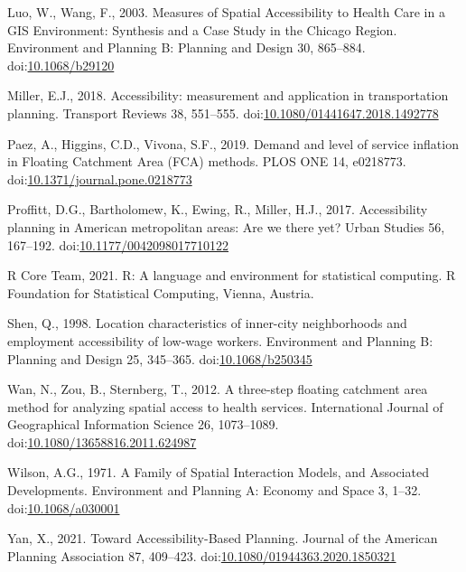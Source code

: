\documentclass[]{elsarticle} %
\newlength{\cslhangindent}
\newlength{\cslentryspacingunit} %
\newenvironment{CSLReferences}[2] %
 {%
  \setlength{\parindent}{0pt}
  \ifodd #1
  \let\oldpar\par
  \def\par{\hangindent=\cslhangindent\oldpar}
  \fi
  \setlength{\parskip}{#2\cslentryspacingunit}
 }%
 {}
\begin{document}
\begin{CSLReferences}{1}{0}
\leavevmode{}%
Luo, W., Wang, F., 2003. Measures of Spatial Accessibility to Health
Care in a GIS Environment: Synthesis and a Case Study in the Chicago
Region. Environment and Planning B: Planning and Design 30, 865--884.
doi:\href{https://doi.org/10.1068/b29120}{10.1068/b29120}

\leavevmode{}%
Miller, E.J., 2018. Accessibility: measurement and application in
transportation planning. Transport Reviews 38, 551--555.
doi:\href{https://doi.org/10.1080/01441647.2018.1492778}{10.1080/01441647.2018.1492778}

\leavevmode{}%
Paez, A., Higgins, C.D., Vivona, S.F., 2019. Demand and level of service
inflation in Floating Catchment Area (FCA) methods. PLOS ONE 14,
e0218773.
doi:\href{https://doi.org/10.1371/journal.pone.0218773}{10.1371/journal.pone.0218773}

\leavevmode{}%
Proffitt, D.G., Bartholomew, K., Ewing, R., Miller, H.J., 2017.
Accessibility planning in American metropolitan areas: Are we there yet?
Urban Studies 56, 167--192.
doi:\href{https://doi.org/10.1177/0042098017710122}{10.1177/0042098017710122}

\leavevmode{}%
R Core Team, 2021. R: A language and environment for statistical
computing. R Foundation for Statistical Computing, Vienna, Austria.

\leavevmode{}%
Shen, Q., 1998. Location characteristics of inner-city neighborhoods and
employment accessibility of low-wage workers. Environment and Planning
B: Planning and Design 25, 345--365.
doi:\href{https://doi.org/10.1068/b250345}{10.1068/b250345}

\leavevmode{}%
Wan, N., Zou, B., Sternberg, T., 2012. A three-step floating catchment
area method for analyzing spatial access to health services.
International Journal of Geographical Information Science 26,
1073--1089.
doi:\href{https://doi.org/10.1080/13658816.2011.624987}{10.1080/13658816.2011.624987}

\leavevmode{}%
Wilson, A.G., 1971. A Family of Spatial Interaction Models, and
Associated Developments. Environment and Planning A: Economy and Space
3, 1--32. doi:\href{https://doi.org/10.1068/a030001}{10.1068/a030001}

\leavevmode{}%
Yan, X., 2021. Toward Accessibility-Based Planning. Journal of the
American Planning Association 87, 409--423.
doi:\href{https://doi.org/10.1080/01944363.2020.1850321}{10.1080/01944363.2020.1850321}

\end{CSLReferences}
\end{document}
